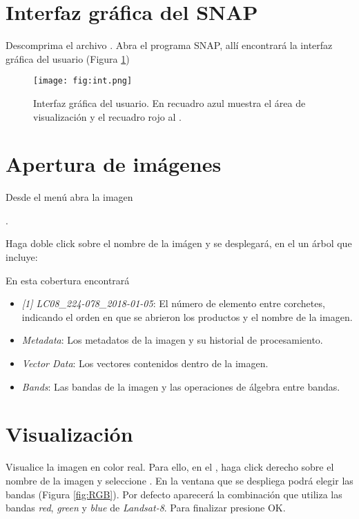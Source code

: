 \section{Interfaz gráfica del SNAP}

Descomprima el archivo . Abra el programa SNAP, allí encontrará la interfaz gráfica del usuario (Figura \ref{fig:int})

\begin{figure}[h!]
    \centering
    \texttt{[image: fig:int.png]}
    \caption{Interfaz gráfica del usuario. En recuadro azul muestra el área de visualización y el recuadro rojo al .}
    \label{fig:int}
\end{figure}

\section{Apertura de imágenes}

Desde el menú  abra la imagen
\begin{center} .
\end{center}
Haga doble click sobre el nombre de la imágen y se desplegará, en el  un árbol que incluye:
\\

En esta cobertura encontrará

\begin{itemize}
    \item \emph{[1] LC08\_224-078\_2018-01-05}: El número de elemento entre corchetes, indicando el orden en que se abrieron los productos y el nombre de la imagen.
    \item \emph{Metadata}: Los metadatos de la imagen y su historial de procesamiento.
    \item \emph{Vector Data}: Los vectores contenidos dentro de la imagen.
    \item \emph{Bands}: Las bandas de la imagen y las operaciones de álgebra entre bandas.
\end{itemize}

\section{Visualización}

Visualice la imagen en color real. Para ello, en el , haga click derecho sobre el nombre de la imagen y seleccione . En la ventana que se despliega podrá elegir las bandas (Figura \ref{fig:RGB}). Por defecto aparecerá la combinación que utiliza las bandas \emph{red}, \emph{green} y \emph{blue} de \emph{Landsat-8}. Para finalizar presione OK.


